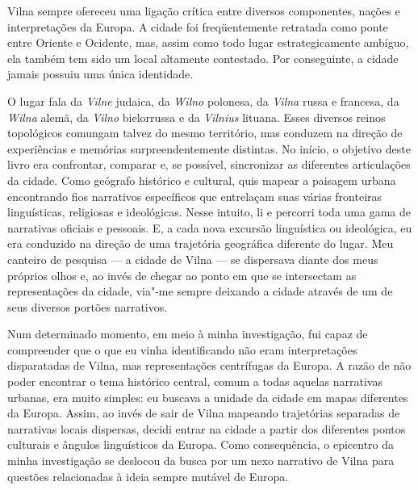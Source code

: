 Vilna sempre ofereceu uma ligação crítica entre diversos componentes,
nações e interpretações da Europa. A cidade foi freqüentemente retratada
como ponte entre Oriente e Ocidente, mas, assim como todo lugar
estrategicamente ambíguo, ela também tem sido um local altamente
contestado. Por conseguinte, a cidade jamais possuiu uma única
identidade. 

O lugar fala da \textit{Vilne} judaica, da \textit{Wilno}
polonesa, da \textit{Vilna} russa e francesa, da \textit{Wilna} alemã, da
\textit{Vilno} bielorrussa e da \textit{Vilnius} lituana. Esses diversos
reinos topológicos comungam talvez do mesmo território, mas conduzem na
direção de experiências e memórias surpreendentemente distintas. No
início, o objetivo deste livro era confrontar, comparar e, se possível,
sincronizar as diferentes articulações da cidade. Como geógrafo
histórico e cultural, quis mapear a paisagem urbana encontrando fios
narrativos específicos que entrelaçam suas várias fronteiras
linguísticas, religiosas e ideológicas. Nesse intuito, li e percorri
toda uma gama de narrativas oficiais e pessoais. E, a cada nova excursão
linguística ou ideológica, eu era conduzido na direção de uma trajetória
geográfica diferente do lugar. Meu canteiro de pesquisa --- a cidade de
Vilna --- se dispersava diante dos meus próprios olhos e, ao invés de
chegar ao ponto em que se intersectam as representações da cidade,
via"-me sempre deixando a cidade através de um de seus diversos portões
narrativos.

Num determinado momento, em meio à minha investigação, fui capaz de
compreender que o que eu vinha identificando não eram interpretações
disparatadas de Vilna, mas representações centrífugas da Europa. A razão
de não poder encontrar o tema histórico central, comum a todas aquelas
narrativas urbanas, era muito simples: eu buscava a unidade da cidade em
mapas diferentes da Europa. Assim, ao invés de sair de Vilna mapeando
trajetórias separadas de narrativas locais dispersas, decidi entrar na
cidade a partir dos diferentes pontos culturais e ângulos linguísticos
da Europa. Como consequência, o epicentro da minha investigação se
deslocou da busca por um nexo narrativo de Vilna para questões
relacionadas à ideia sempre mutável de Europa.

